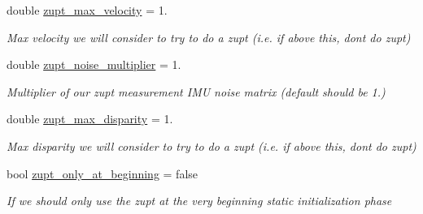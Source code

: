 \begin{DoxyCompactItemize}
\mbox{\label{structov__msckf_1_1VioManagerOptions_ad1a08e427b280edf0bb7a64ea71d1c80}} 
double \hyperlink{structov__msckf_1_1VioManagerOptions_ad1a08e427b280edf0bb7a64ea71d1c80}{zupt\+\_\+max\+\_\+velocity} = 1.
\begin{DoxyCompactList}\small\item\em Max velocity we will consider to try to do a zupt (i.\+e. if above this, don\textquotesingle{}t do zupt) \end{DoxyCompactList}\item 
\mbox{\label{structov__msckf_1_1VioManagerOptions_a9c9396ee0ec6228d99d458e8a02f47cd}} 
double \hyperlink{structov__msckf_1_1VioManagerOptions_a9c9396ee0ec6228d99d458e8a02f47cd}{zupt\+\_\+noise\+\_\+multiplier} = 1.
\begin{DoxyCompactList}\small\item\em Multiplier of our zupt measurement I\+MU noise matrix (default should be 1.) \end{DoxyCompactList}\item 
\mbox{\label{structov__msckf_1_1VioManagerOptions_a0d6b97164305763b5f1c5e302fbeb02a}} 
double \hyperlink{structov__msckf_1_1VioManagerOptions_a0d6b97164305763b5f1c5e302fbeb02a}{zupt\+\_\+max\+\_\+disparity} = 1.
\begin{DoxyCompactList}\small\item\em Max disparity we will consider to try to do a zupt (i.\+e. if above this, don\textquotesingle{}t do zupt) \end{DoxyCompactList}\item 
\mbox{\label{structov__msckf_1_1VioManagerOptions_a0b65d82ff8ef21e22774f070d9f42938}} 
bool \hyperlink{structov__msckf_1_1VioManagerOptions_a0b65d82ff8ef21e22774f070d9f42938}{zupt\+\_\+only\+\_\+at\+\_\+beginning} = false
\begin{DoxyCompactList}\small\item\em If we should only use the zupt at the very beginning static initialization phase \end{DoxyCompactList}\item 
\mbox{\label{structov__msckf_1_1VioManagerOptions_af1c76781e016ae09e49bd4d8e42006e6}} 

\end{DoxyCompactItemize}
